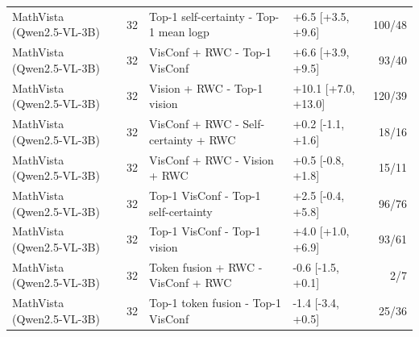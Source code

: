 \begin{table}[t]
\begin{tabular}{llllr}
MathVista (Qwen2.5-VL-3B) & 32 & Top-1 self-certainty - Top-1 mean logp & +6.5 [+3.5, +9.6] & 100/48 \\
MathVista (Qwen2.5-VL-3B) & 32 & VisConf + RWC - Top-1 VisConf & +6.6 [+3.9, +9.5] & 93/40 \\
MathVista (Qwen2.5-VL-3B) & 32 & Vision + RWC - Top-1 vision & +10.1 [+7.0, +13.0] & 120/39 \\
MathVista (Qwen2.5-VL-3B) & 32 & VisConf + RWC - Self-certainty + RWC & +0.2 [-1.1, +1.6] & 18/16 \\
MathVista (Qwen2.5-VL-3B) & 32 & VisConf + RWC - Vision + RWC & +0.5 [-0.8, +1.8] & 15/11 \\
MathVista (Qwen2.5-VL-3B) & 32 & Top-1 VisConf - Top-1 self-certainty & +2.5 [-0.4, +5.8] & 96/76 \\
MathVista (Qwen2.5-VL-3B) & 32 & Top-1 VisConf - Top-1 vision & +4.0 [+1.0, +6.9] & 93/61 \\
MathVista (Qwen2.5-VL-3B) & 32 & Token fusion + RWC - VisConf + RWC & -0.6 [-1.5, +0.1] & 2/7 \\
MathVista (Qwen2.5-VL-3B) & 32 & Top-1 token fusion - Top-1 VisConf & -1.4 [-3.4, +0.5] & 25/36 \\
\bottomrule
\end{tabular}
\end{table}
